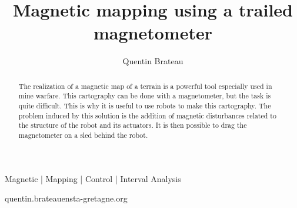\documentclass[times, twoside, watermark]{style}
\begin{document}
\title{Magnetic mapping using a trailed magnetometer}

\author[1,\Letter]{Quentin Brateau}


\maketitle

\begin{abstract}
    The realization of a magnetic map of a terrain is a powerful tool especially used in mine warfare. This cartography can be done with a magnetometer, but the task is quite difficult. This is why it is useful to use robots to make this cartography. The problem induced by this solution is the addition of magnetic disturbances related to the structure of the robot and its actuators. It is then possible to drag the magnetometer on a sled behind the robot. 
\end {abstract}

\begin{keywords}
Magnetic | Mapping | Control | Interval Analysis
\end{keywords}

\begin{corrauthor}
quentin.brateau\at ensta-gretagne.org
\end{corrauthor}











% 

\end{document}
